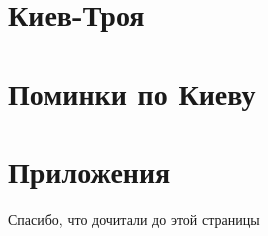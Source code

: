 \documentclass[a5paper,10pt,openany]{book}
\begin{document}



\part{Киев-Троя}











%


\part{Поминки по Киеву}







\backmatter


\part*{Приложения}



%

%
%
%
%
%


\begin{thebibliography}{999}

\end{thebibliography}




\newpage

\pagestyle{empty}

\clearpage
{}
\begin{center}
\begin{minipage}{\textwidth}
\begin{center}Спасибо, что дочитали до этой страницы\end{center}
\end{minipage}
\end{center}
\clearpage
\end{document}
